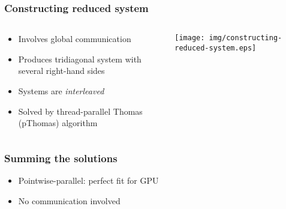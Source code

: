\begin{frame}
\frametitle{Constructing reduced system}
\begin{columns}
\begin{column}{0.5\textwidth}
\begin{itemize}
\item Involves global communication
\item Produces tridiagonal system with
    several right-hand sides
\item Systems are \emph{interleaved}
\item Solved by thread-parallel Thomas
    (pThomas) algorithm
\end{itemize}
\end{column}
\begin{column}{0.5\textwidth}
\texttt{[image: img/constructing-reduced-system.eps]}
\end{column}
\end{columns}
\end{frame}

\begin{frame}
\frametitle{Summing the solutions}
\begin{itemize}
\item Pointwise-parallel: perfect fit for GPU
\item No communication involved
\end{itemize}
\end{frame}
